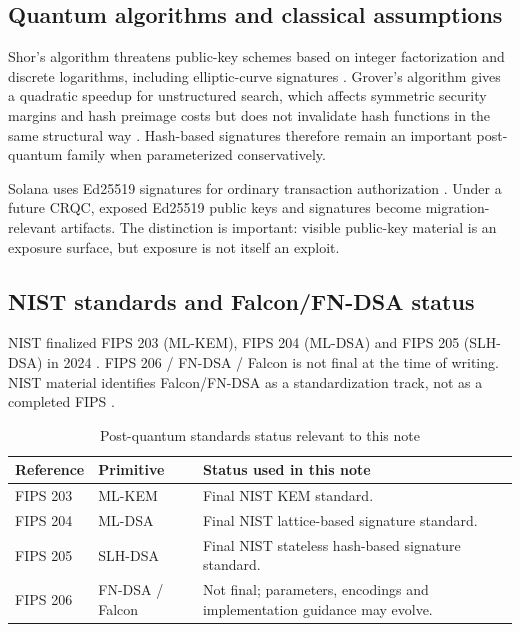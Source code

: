 \documentclass[11pt,a4paper,oneside,parskip=false]{scrartcl}
\begin{document}
\subsection{Quantum algorithms and classical assumptions}

Shor's algorithm threatens public-key schemes based on integer factorization and discrete logarithms, including elliptic-curve signatures \cite{shor1997}. Grover's algorithm gives a quadratic speedup for unstructured search, which affects symmetric security margins and hash preimage costs but does not invalidate hash functions in the same structural way \cite{grover1996}. Hash-based signatures therefore remain an important post-quantum family when parameterized conservatively.

Solana uses Ed25519 signatures for ordinary transaction authorization \cite{rfc8032}. Under a future CRQC, exposed Ed25519 public keys and signatures become migration-relevant artifacts. The distinction is important: visible public-key material is an exposure surface, but exposure is not itself an exploit.

\subsection{NIST standards and Falcon/FN-DSA status}

NIST finalized FIPS 203 (ML-KEM), FIPS 204 (ML-DSA) and FIPS 205 (SLH-DSA) in 2024 \cite{nist-fips203,nist-fips204,nist-fips205}. FIPS 206 / FN-DSA / Falcon is not final at the time of writing. NIST material identifies Falcon/FN-DSA as a standardization track, not as a completed FIPS \cite{nist-pqc-project,nist-fips206-perlner}.

\begin{table}[htbp]
\centering
\caption{Post-quantum standards status relevant to this note}
\label{tab:nist-standards}
\small
\begin{tabularx}{\textwidth}{L{0.18\textwidth}L{0.22\textwidth}Y}
\toprule
\textbf{Reference} & \textbf{Primitive} & \textbf{Status used in this note} \\
\midrule
FIPS 203 & ML-KEM & Final NIST KEM standard. \\
FIPS 204 & ML-DSA & Final NIST lattice-based signature standard. \\
FIPS 205 & SLH-DSA & Final NIST stateless hash-based signature standard. \\
FIPS 206 & FN-DSA / Falcon & Not final; parameters, encodings and implementation guidance may evolve. \\
\bottomrule
\end{tabularx}
\end{table}
\end{document}
